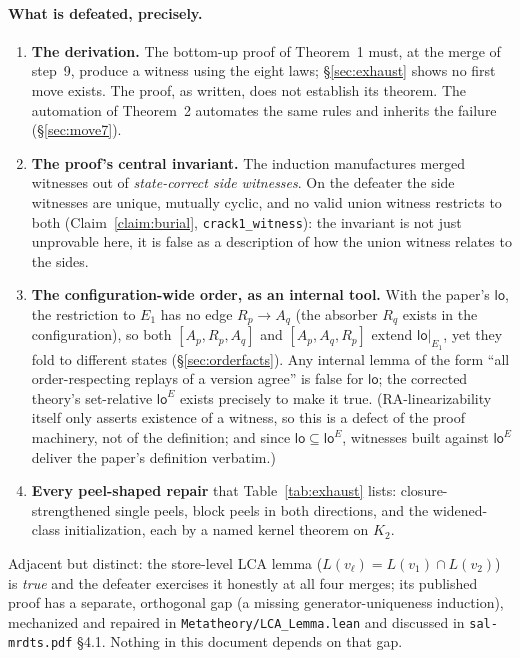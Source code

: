 \documentclass[11pt]{article}
\newcommand{\loE}[1]{\mathsf{lo}^{#1}}
\newcommand{\lopaper}{\mathsf{lo}}
\newcommand{\lean}[1]{\texttt{#1}}
\newcommand{\Ap}{A_p}
\newcommand{\Aq}{A_q}
\newcommand{\Rp}{R_p}
\newcommand{\Rq}{R_q}
\begin{document}
\paragraph{What is defeated, precisely.}
\begin{enumerate}[leftmargin=2.2em]
\item \textbf{The derivation.} The bottom-up proof of Theorem~1 must,
  at the merge of step~9, produce a witness using the eight laws;
  \S\ref{sec:exhaust} shows no first move exists. The proof, as
  written, does not establish its theorem. The automation of
  Theorem~2 automates the same rules and inherits the failure
  (\S\ref{sec:move7}).
\item \textbf{The proof's central invariant.} The induction
  manufactures merged witnesses out of \emph{state-correct side
  witnesses}. On the defeater the side witnesses are unique, mutually
  cyclic, and no valid union witness restricts to both
  (Claim~\ref{claim:burial}, \lean{crack1\_witness}): the invariant is
  not just unprovable here, it is false as a description of how the
  union witness relates to the sides.
\item \textbf{The configuration-wide order, as an internal tool.} With
  the paper's $\lopaper$, the restriction to $E_1$ has no edge
  $\Rp \to \Aq$ (the absorber $\Rq$ exists in the configuration), so
  both $[\Ap,\Rp,\Aq]$ and $[\Ap,\Aq,\Rp]$ extend
  $\lopaper|_{E_1}$, yet they fold to different states
  (\S\ref{sec:orderfacts}). Any internal lemma of the form ``all
  order-respecting replays of a version agree'' is false for
  $\lopaper$; the corrected theory's set-relative $\loE{E}$ exists
  precisely to make it true. (RA-linearizability itself only asserts
  existence of a witness, so this is a defect of the proof
  machinery, not of the definition; and since
  $\lopaper \subseteq \loE{E}$, witnesses built against $\loE{E}$
  deliver the paper's definition verbatim.)
\item \textbf{Every peel-shaped repair} that Table~\ref{tab:exhaust}
  lists: closure-strengthened single peels, block peels in both
  directions, and the widened-class initialization, each by a named
  kernel theorem on $K_2$.
\end{enumerate}

Adjacent but distinct: the store-level LCA lemma
($L(v_\ell) = L(v_1) \cap L(v_2)$) is \emph{true} and the defeater
exercises it honestly at all four merges; its published proof has a
separate, orthogonal gap (a missing generator-uniqueness induction),
mechanized and repaired in \lean{Metatheory/LCA\_Lemma.lean} and
discussed in \texttt{sal-mrdts.pdf} \S4.1. Nothing in this document
depends on that gap.
\end{document}
